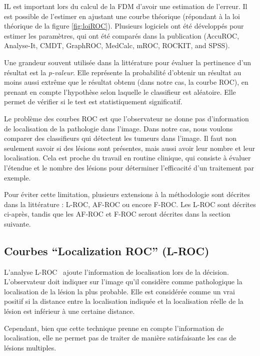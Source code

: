IL est important lors du calcul de la FDM d'avoir une estimation de l'erreur. Il est possible de l'estimer en ajustant une courbe théorique (répondant à la loi théorique de la figure \ref{fig:loiROC}). Plusieurs logiciels ont été développés pour estimer les paramètres, qui ont été comparés dans la publication \cite{CarstenStephan03012003} (AccuROC, Analyse-It, CMDT, GraphROC, MedCalc, mROC, ROCKIT, and SPSS).

\label{lab:p-valeur}
Une grandeur souvent utilisée dans la littérature pour évaluer la pertinence d'un résultat est la \emph{p-valeur}. Elle représente la probabilité d'obtenir un résultat au moins aussi extrême que le résultat obtenu (dans notre cas, la courbe ROC), en prenant en compte l'hypothèse selon laquelle le classifieur est aléatoire. Elle permet de vérifier si le test est statistiquement significatif.

Le problème des courbes ROC est que l'observateur ne donne pas d'information de localisation de la pathologie dans l'image. Dans notre cas, nous voulons comparer des classifieurs qui détectent les tumeurs dans l'image. Il faut non seulement savoir si des lésions sont présentes, mais aussi avoir leur nombre et leur localisation. Cela est proche du travail en routine clinique, qui consiste à évaluer l'étendue et le nombre des lésions pour déterminer l'efficacité d'un traitement par exemple. 

Pour éviter cette limitation, plusieurs extensions à la méthodologie \ROC sont décrites dans la littérature : L-ROC, AF-ROC ou encore F-ROC. Les L-ROC sont décrites ci-après, tandis que les AF-ROC et F-ROC seront décrites dans la section suivante.

\subsection{Courbes ``Localization ROC'' (L-ROC)}

L'analyse L-ROC~\cite{farquhar1999roc} ajoute l'information de localisation lors de la décision. L'observateur doit indiquer sur l'image qu'il considère comme pathologique la localisation de la lésion la plus probable. Elle est considérée comme un vrai positif si la distance entre la localisation indiquée et la localisation réelle de la lésion est inférieur à une certaine distance.

Cependant, bien que cette technique prenne en compte l'information de localisation, elle ne permet pas de traiter de manière satisfaisante les cas de lésions multiples.


